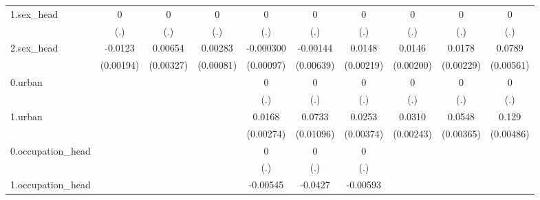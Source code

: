 \begin{table}[htbp]
\begin{tabular}{l*{9}{c}}
1.sex\_head  &           0         &           0         &           0         &           0         &           0         &           0         &           0         &           0         &           0         \\
            &         (.)         &         (.)         &         (.)         &         (.)         &         (.)         &         (.)         &         (.)         &         (.)         &         (.)         \\
2.sex\_head  &     -0.0123\sym{***}&     0.00654\sym{**} &     0.00283\sym{***}&   -0.000300         &    -0.00144         &      0.0148\sym{***}&      0.0146\sym{***}&      0.0178\sym{***}&      0.0789\sym{***}\\
            &   (0.00194)         &   (0.00327)         &   (0.00081)         &   (0.00097)         &   (0.00639)         &   (0.00219)         &   (0.00200)         &   (0.00229)         &   (0.00561)         \\
0.urban     &                     &                     &                     &           0         &           0         &           0         &           0         &           0         &           0         \\
            &                     &                     &                     &         (.)         &         (.)         &         (.)         &         (.)         &         (.)         &         (.)         \\
1.urban     &                     &                     &                     &      0.0168\sym{***}&      0.0733\sym{***}&      0.0253\sym{***}&      0.0310\sym{***}&      0.0548\sym{***}&       0.129\sym{***}\\
            &                     &                     &                     &   (0.00274)         &   (0.01096)         &   (0.00374)         &   (0.00243)         &   (0.00365)         &   (0.00486)         \\
0.occupation\_head&                     &                     &                     &           0         &           0         &           0         &                     &                     &                     \\
            &                     &                     &                     &         (.)         &         (.)         &         (.)         &                     &                     &                     \\
1.occupation\_head&                     &                     &                     &    -0.00545         &     -0.0427\sym{**} &    -0.00593         &                     &                     &                     \\

\end{tabular}
\end{table}
